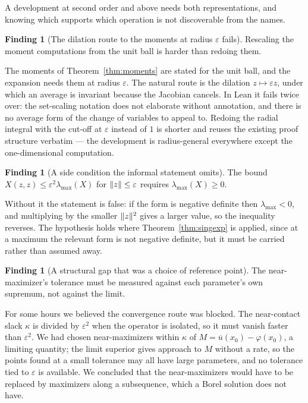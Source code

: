 \documentclass[11pt,reqno]{amsart}
\newcommand{\eps}{\varepsilon}
\DeclarePairedDelimiter{\norm}{\lVert}{\rVert}
\theoremstyle{plain}
\theoremstyle{definition}
\newtheorem{finding}[theorem]{Finding}
\begin{document}
A development at second order and above needs both representations, and
knowing which supports which operation is not discoverable from the names.

\begin{finding}[The dilation route to the moments at radius $\eps$
fails]\label{find:dilation}
Rescaling the moment computations from the unit ball is harder than redoing
them.
\end{finding}

The moments of Theorem~\ref{thm:moments} are stated for the unit ball, and the
expansion needs them at radius $\eps$. The natural route is the dilation
$z \mapsto \eps z$, under which an average is invariant because the Jacobian
cancels. In Lean it fails twice over: the set-scaling notation does not
elaborate without annotation, and there is no average form of the change of
variables to appeal to. Redoing the radial integral with the cut-off at $\eps$
instead of $1$ is shorter and reuses the existing proof structure verbatim ---
the development is radius-general everywhere except the one-dimensional
computation.

\begin{finding}[A side condition the informal statement
omits]\label{find:lammax}
The bound $X(z,z) \le \eps^2\lambda_{\max}(X)$ for $\norm{z} \le \eps$
requires $\lambda_{\max}(X) \ge 0$.
\end{finding}

Without it the statement is false: if the form is negative definite then
$\lambda_{\max} < 0$, and multiplying by the smaller $\norm{z}^2$ gives a
larger value, so the inequality reverses. The hypothesis holds where
Theorem~\ref{thm:singexp} is applied, since at a maximum the relevant form is
not negative definite, but it must be carried rather than assumed away.

\begin{finding}[A structural gap that was a choice of reference
point]\label{find:refpoint}
The near-maximizer's tolerance must be measured against each parameter's own
supremum, not against the limit.
\end{finding}

For some hours we believed the convergence route was blocked. The near-contact
slack $\kappa$ is divided by $\eps^2$ when the operator is isolated, so it must
vanish faster than $\eps^2$. We had chosen near-maximizers within $\kappa$ of
$M = \overline{u}(x_0) - \varphi(x_0)$, a limiting quantity; the limit superior
gives approach to $M$ without a rate, so the points found at a small tolerance
may all have large parameters, and no tolerance tied to $\eps$ is available. We
concluded that the near-maximizers would have to be replaced by maximizers along
a subsequence, which a Borel solution does not have.
\end{document}

